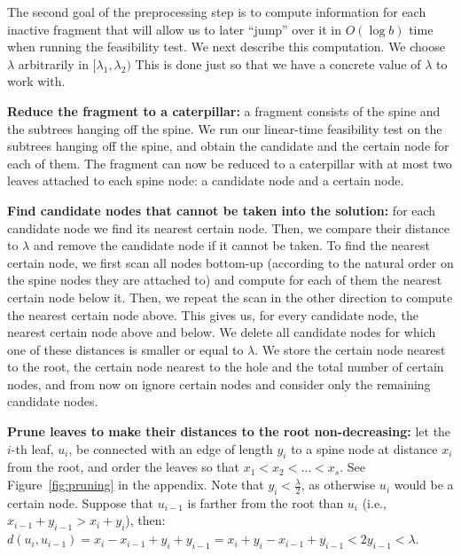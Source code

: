 \documentclass[a4paper,UKenglish]{lipics-v2016}
\newcounter{mycounter}
\newenvironment{noindlist}
 {\begin{list}{\arabic{mycounter}.~~}{\usecounter{mycounter} \labelsep=0em \labelwidth=0em \leftmargin=0em \itemindent=0em}}
 {\end{list}}
\theoremstyle{plain}
\begin{document}
The second goal of the preprocessing step is to
compute information for each inactive fragment that will allow us to later ``jump'' over it in $O(\log b)$ time when running the feasibility test.  We next describe this computation.  We choose $\lambda$ arbitrarily in
$[\lambda_1,\lambda_2)$ This is done just so that we have a concrete value of $\lambda$ to work with.

\begin{noindlist}
\item\textbf{Reduce the fragment to a caterpillar:}
a fragment consists of the spine and the subtrees hanging off the spine. %
We run our linear-time feasibility test on the subtrees hanging off the spine, and obtain
the candidate and the certain node for each of them. The fragment can now be reduced to a caterpillar with at most two leaves attached to each
spine node: a candidate node and a certain node.
\item\label{removing certain nodes}
\textbf{Find candidate nodes that cannot be taken into the solution:}
for each candidate node we find its nearest certain node. Then, we compare their distance to $\lambda$ and remove the
candidate node if it cannot be taken. To find the nearest certain node, we first scan all nodes bottom-up (according to the natural order
on the spine nodes they are attached to) and compute for each of them the nearest certain node below it. Then, we repeat the scan
in the other direction to compute the nearest certain node above. This gives us, for every candidate node, the nearest certain node above
and below. We delete all candidate nodes for which one of these distances is smaller or equal to $\lambda$.
We store the certain node nearest to the root, the certain node nearest to the hole and the total number of certain nodes,
and from now on ignore certain nodes and consider only the remaining candidate nodes.
\item\label{making distances from the root monotone}
\textbf{Prune leaves to make their distances to the root non-decreasing:}
let the $i$-th leaf, $u_{i}$, be connected with an edge of length $y_{i}$ to a spine node at distance $x_{i}$ from the root,
and order the leaves so that $x_{1}<x_{2}<\ldots<x_{s}$. See Figure~\ref{fig:pruning} in the appendix.
Note that $y_{i}<\frac{\lambda}{2}$, as otherwise $u_{i}$ would be a certain node.
Suppose that $u_{i-1}$ is farther from the root than $u_i$ (i.e.,
$x_{i-1}+y_{i-1} > x_i+y_i$), then:
$d(u_{i},u_{i-1}) = x_i-x_{i-1}+y_i+y_{i-1} = x_{i} + y_{i} - x_{i-1} + y_{i-1} < 2y_{i-1} < \lambda.$

\end{noindlist}
\end{document}
